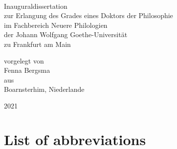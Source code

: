 \documentclass[hidelinks,a4paper,twoside,openright,11pt]{memoir}
\begin{document}

\frontmatter

\begin{titlingpage}

\center
\Large

\phantom{xx}

\vspace{6em}

{\huge
{}}\\

\vspace{5em}

Inauguraldissertation\\
zur Erlangung des Grades eines Doktors der Philosophie\\
im Fachbereich Neuere Philologien\\
der Johann Wolfgang Goethe-Universität\\
zu Frankfurt am Main\\

\vspace{7em}

vorgelegt von\\
Fenna Bergsma\\
aus\\
Boarnsterhim, Niederlande\\

\vspace{7em}

2021

\end{titlingpage}


\clearpage

\phantom{x}
\vspace{-7em}
\tableofcontents
\clearpage

\phantom{x}
\vspace{-7em}
\listoftables
\clearpage

\phantom{x}
\vspace{-7em}
\listoffigures
\clearpage

\chapter*[List of abbreviations]{List of abbreviations}
\begingroup
  \setlength{\LTleft}{-\tabcolsep}
\printacronyms[include=abbr, heading=none]
\endgroup
{}
\clearpage

\mainmatter
\setcounter{secnumdepth}{4}
\end{document}
